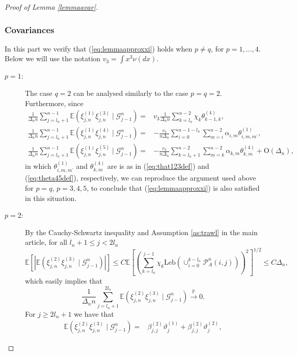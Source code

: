 \documentclass[10pt,a4paper]{amsart}
\newcommand{\Leb}{\ensuremath{\mathrm{Leb}}}
\begin{document}
\begin{proof}[Proof of Lemma \ref{lemmaavar}]
	\subsubsection*{Covariances}
		In this part we verify that (\ref{eq:lemmaapproxxi}) holds when $p\neq q$,
	for $p=1,\ldots,4$. Below we will use the notation $v_{3}=\int x^{3}\nu(dx)$.
	\begin{description}
		\item [{$p=1$:}] The case $q=2$ can be analysed similarly to the case
		$p=q=2$. Furthermore, since
		\begin{align*}
			\frac{1}{\Delta_{n}n}\sum_{j=l_{n}+1}^{n-1}\mathbb{E}(\xi_{j,n}^{(1)}\xi_{j,n}^{(3)}\mid\mathscr{G}_{j-1}^{n})= & v_{3}\frac{1}{\Delta_{n}n}\sum_{k=l_{n}}^{n-2}\chi_{k}\theta_{k-1,k}^{(4)},\\
			\frac{1}{\Delta_{n}n}\sum_{j=l_{n}+1}^{n-1}\mathbb{E}(\xi_{j,n}^{(1)}\xi_{j,n}^{(4)}\mid\mathscr{G}_{j-1}^{n})= & -\frac{v_{3}}{n\Delta_{n}}\sum_{i=0}^{n-1-l_{n}}\sum_{m=i}^{n-2}\alpha_{i,m}\theta_{i,m,m^{\prime}}^{(1)},\\
			\frac{1}{\Delta_{n}n}\sum_{j=l_{n}+1}^{n-1}\mathbb{E}(\xi_{j,n}^{(1)}\xi_{j,n}^{(5)}\mid\mathscr{G}_{j-1}^{n})= & -\frac{v_{3}}{n\Delta_{n}}\sum_{k=l_{n}+1}^{n-2}\sum_{m=k}^{n-2}\alpha_{k,m}\theta_{k,m}^{(4)}+\mathrm{O}(\Delta_n),
		\end{align*}
		in which $\theta_{i,m,m^{\prime}}^{(1)}$ and $\theta_{k,m}^{(4)}$
		are is as in  (\ref{eq:that123def}) and (\ref{eq:theta45def}), respectively,
		we can reproduce the argument used above for $p=q$, $p=3,4,5$, to
		conclude that (\ref{eq:lemmaapproxxi}) is also satisfied in this
		situation. 
		\item [{$p=2$:}] By the Cauchy-Schwartz inequality and Assumption 
		\eqref{as:trawl}
		in the main article, 
		for all $l_{n}+1\leq j<2l_{n}$
		\[
		\mathbb{E}\left[\left|\mathbb{E}(\xi_{j,n}^{(2)}\xi_{j,n}^{(3)}\mid\mathscr{G}_{j-1}^{n})\right|\right]\leq C\mathbb{E}\left[\left(\sum_{k=l_{n}}^{j-1}\chi_{k}\Leb(\cup_{i=0}^{k-l_{n}}\mathcal{P}_{A}^{n}(i,j))\right)^{2}\right]^{1/2}\leq C\Delta_{n},
		\]
		which easily implies that
		\[
		\frac{1}{\Delta_{n}n}\sum_{j=l_{n}+1}^{2l_{n}}\mathbb{E}(\xi_{j,n}^{(2)}\xi_{j,n}^{(3)}\mid\mathscr{G}_{j-1}^{n})\overset{\mathbb{P}}{\rightarrow}0.
		\]
		For $j\geq2l_{n}+1$ we have that 
		\begin{align*}
			\mathbb{E}(\xi_{j,n}^{(2)}\xi_{j,n}^{(3)}\mid\mathscr{G}_{j-1}^{n})= & \beta_{j,j}^{(2)}\vartheta_{j}^{(1)}+\beta_{j,j}^{(2)}\vartheta_{j}^{(2)},
		\end{align*}

\end{description}
\end{proof}
\end{document}
